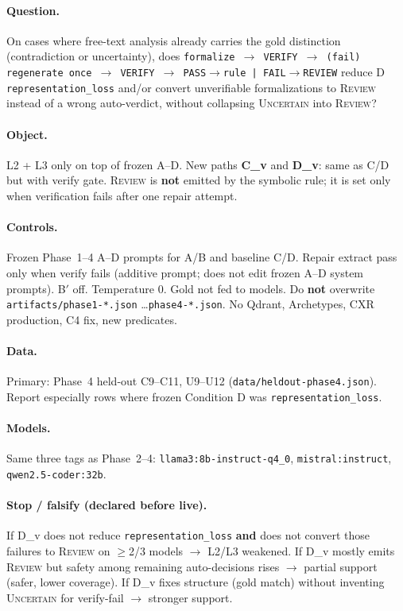\documentclass[11pt,a4paper]{article}
\newcommand{\unc}{\textsc{Uncertain}}
\newcommand{\rev}{\textsc{Review}}
\begin{document}
\paragraph{Question.}
On cases where free-text analysis already carries the gold distinction (contradiction or uncertainty), does
\texttt{formalize $\rightarrow$ VERIFY $\rightarrow$ (fail) regenerate once $\rightarrow$ VERIFY $\rightarrow$ PASS$\rightarrow$rule | FAIL$\rightarrow$REVIEW}
reduce D \texttt{representation\_loss} and/or convert unverifiable formalizations to \rev{} instead of a wrong auto-verdict,
without collapsing \unc{} into \rev?

\paragraph{Object.}
L2 + L3 only on top of frozen A--D.
New paths \textbf{C\_v} and \textbf{D\_v}: same as C/D but with verify gate.
\rev{} is \textbf{not} emitted by the symbolic rule; it is set only when verification fails after one repair attempt.

\paragraph{Controls.}
Frozen Phase~1--4 A--D prompts for A/B and baseline C/D.
Repair extract pass only when verify fails (additive prompt; does not edit frozen A--D system prompts).
B$'$ off. Temperature 0. Gold not fed to models.
Do \textbf{not} overwrite \texttt{artifacts/phase1-*.json} \ldots \texttt{phase4-*.json}.
No Qdrant, Archetypes, CXR production, C4 fix, new predicates.

\paragraph{Data.}
Primary: Phase~4 held-out C9--C11, U9--U12 (\texttt{data/heldout-phase4.json}).
Report especially rows where frozen Condition D was \texttt{representation\_loss}.

\paragraph{Models.}
Same three tags as Phase~2--4: \texttt{llama3:8b-instruct-q4\_0}, \texttt{mistral:instruct}, \texttt{qwen2.5-coder:32b}.

\paragraph{Stop / falsify (declared before live).}
If D\_v does not reduce \texttt{representation\_loss} \textbf{and} does not convert those failures to \rev{} on $\geq$2/3 models $\rightarrow$ L2/L3 weakened.
If D\_v mostly emits \rev{} but safety among remaining auto-decisions rises $\rightarrow$ partial support (safer, lower coverage).
If D\_v fixes structure (gold match) without inventing \unc{} for verify-fail $\rightarrow$ stronger support.
\end{document}
